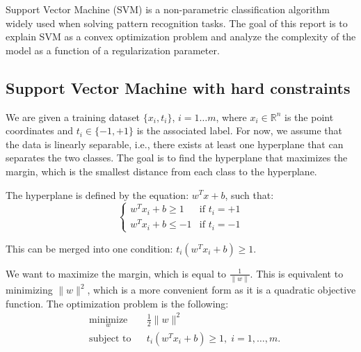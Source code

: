 \label{sec:intro}

Support Vector Machine (SVM) is a non-parametric classification algorithm widely used when solving pattern recognition tasks. The goal of this report is to explain SVM as a convex optimization problem and analyze the complexity of the model as a function of a regularization parameter.
\subsection{Support Vector Machine with hard constraints}
We are given a training dataset $\{x_i, t_i\}$, $i=1\ldots m$, where $x_i \in \mathbb{R}^n$ is the point coordinates and  $t_i \in \{-1,+1 \}$ is the associated label. For now, we assume that the data is linearly separable, i.e., there exists at least one hyperplane that can separates the two classes. The goal is to find the hyperplane that maximizes the margin, which is the smallest distance from each class to the hyperplane.

The hyperplane is defined by the equation: $w^Tx+b$, such that:
\[
  \begin{cases} 
   w^Tx_i+b \geq 1 & \text{if } t_i=+1 \\
   w^Tx_i+b \leq -1       & \text{if } t_i=-1
  \end{cases}
\]

This can be merged into one condition: $ t_i(w^Tx_i+b) \geq 1$.

We want to maximize the margin, which is equal to $\frac{1}{\|w\|}$. This is equivalent to minimizing $\|w\|^2$, which is a more convenient form as it is a quadratic objective function. The optimization problem is the following:
\begin{equation}
\begin{aligned}
& \underset{w}{\text{minimize}}
& & \frac{1}{2}\|w\|^2 \\
& \text{subject to}
& & t_i(w^Tx_i+b) \geq 1, \; i = 1, \ldots, m.
\label{eq:svm_hard}
\end{aligned}
\end{equation}

